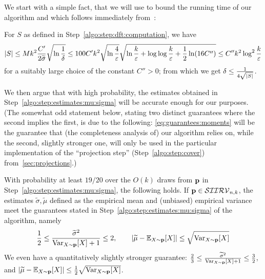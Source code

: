 We start with a simple fact, that we will use to bound the running time of our algorithm and which follows immediately from~\cite[Claim 2.4]{DKS:15}:
\begin{fact}\label{fact:bound:size:s}
  For $S$ as defined in Step~\ref{algo:step:dft:computation}, we have
  \[
  \abs{S} \leq Mk^2 \frac{C'}{2\widetilde{\sigma}} \sqrt{\ln\frac{1}{\delta}} \leq 100C' k^2 \sqrt{\ln\frac{4}{\eps}}\sqrt{\ln \frac{k}{\eps} +\log\log \frac{k}{\eps} + \frac{1}{2} \ln(16C'')}
  \leq C'' k^2\log^2\frac{k}{\eps}
  \]
  for a suitably large choice of the constant $C''>0$; from which we get $\delta \leq \frac{1}{4\sqrt{\abs{S}}}$.
\end{fact}

We then argue that with high probability, the estimates obtained in Step~\ref{algo:step:estimates:mu:sigma} will be accurate enough for our purposes. (The somewhat odd statement below, stating two distinct guarantees where the second implies the first, is due to the following: \cref{eq:guarantees:moments} will be the guarantee that (the completeness analysis of) our algorithm relies on, while the second, slightly stronger one, will only be used in the particular implementation of the ``projection step'' (Step~\ref{algo:step:cover}) from~\cref{sec:projections}.)
\begin{claim}\label{claim:estimate:moments}
  With probability at least $19/20$ over the $O(k)$ draws from $\p$ in Step~\ref{algo:step:estimates:mu:sigma}, the following holds. If $\p\in\classksiirv[n]{k}$, the estimates $\widetilde{\sigma},\widetilde{\mu}$ defined as the empirical mean and (unbiased) empirical variance meet the guarantees stated in Step~\ref{algo:step:estimates:mu:sigma} of the algorithm, namely
  \begin{equation}\label{eq:guarantees:moments}
      \frac{1}{2}\leq \frac{\widetilde{\sigma}^2}{\var_{X \sim \p}[X]+1} \leq 2, \qquad \abs{ \widetilde{\mu} - \shortexpect_{X \sim \p}[X] } \leq  \sqrt{\var_{X \sim \p}[X]}
  \end{equation}
  We even have a quantitatively slightly stronger guarantee:
  $
      \frac{2}{3}\leq \frac{\widetilde{\sigma}^2}{\var_{X \sim \p}[X]+1} \leq \frac{3}{2}$, and $\abs{ \widetilde{\mu} - \shortexpect_{X \sim \p}[X] } \leq  \frac{1}{2}\sqrt{\var_{X \sim \p}[X]}
  $.
\end{claim}
